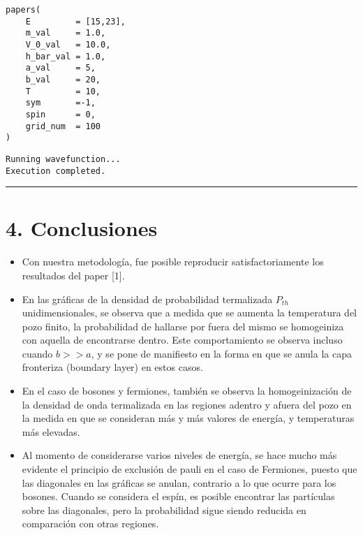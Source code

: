 \documentclass[11pt]{article}
\begin{document}
\begin{center}

\end{center}

\begin{verbatim}
papers(
    E         = [15,23],
    m_val     = 1.0,
    V_0_val   = 10.0,
    h_bar_val = 1.0,
    a_val     = 5,
    b_val     = 20,
    T         = 10,
    sym       =-1,
    spin      = 0,
    grid_num  = 100
)
\end{verbatim}

\label{org565c9f7}
\begin{verbatim}
Running wavefunction...
Execution completed.
\end{verbatim}

\begin{center}

\end{center}

\noindent\rule{\textwidth}{0.5pt}
\section{\textbf{4. Conclusiones}}
\label{sec:org9c0ba91}
\begin{itemize}
\item Con nuestra metodología, fue posible reproducir satisfactoriamente los
resultados del paper [1].
\item En las gráficas de la densidad de probabilidad termalizada \(P_{th}\) unidimensionales, se
observa que a medida que se aumenta la temperatura del pozo finito, la
probabilidad de hallarse por fuera del mismo se homogeiniza con aquella de
encontrarse dentro. Este comportamiento se observa incluso cuando \(b >> a\),
y se pone de manifiesto en la forma en que se anula la capa fronteriza
(boundary layer) en estos casos.

\item En el caso de bosones y fermiones, también se observa la homogeinización de
la densidad de onda termalizada en las regiones adentro y afuera del pozo en
la medida en que se consideran más y más valores de energía, y temperaturas
más elevadas.

\item Al momento de considerarse varios niveles de energía, se hace mucho más
evidente el principio de exclusión de pauli en el caso de Fermiones, puesto
que las diagonales en las gráficas se anulan, contrario a lo que ocurre para
los bosones. Cuando se considera el espín, es posible encontrar las partículas
sobre las diagonales, pero la probabilidad sigue siendo reducida en
comparación con otras regiones.
\end{itemize}
\end{document}
